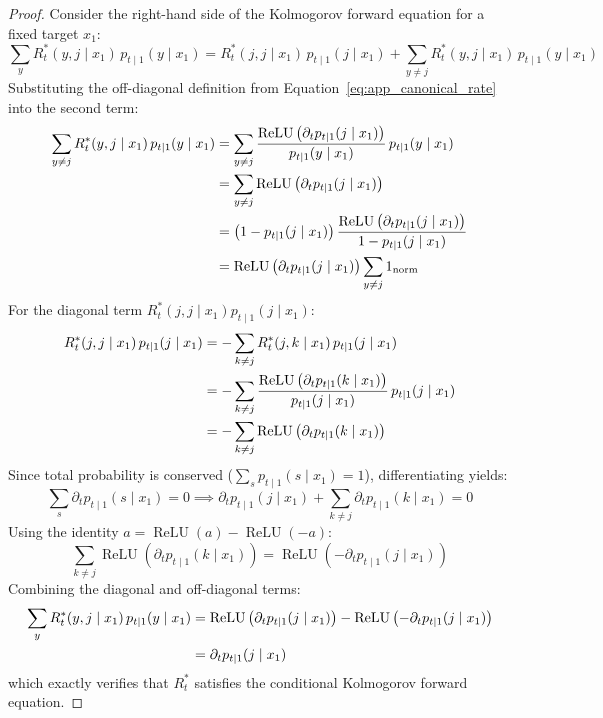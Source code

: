 \begin{proof}
Consider the right-hand side of the Kolmogorov forward equation for a fixed target $x_1$:
\begin{equation}
\sum_{y} R_t^*(y, j \mid x_1) \, p_{t \mid 1}(y \mid x_1) = R_t^*(j, j \mid x_1) \, p_{t \mid 1}(j \mid x_1) + \sum_{y \ne j} R_t^*(y, j \mid x_1) \, p_{t \mid 1}(y \mid x_1)
\label{eq:app_kolm_split}
\end{equation}
Substituting the off-diagonal definition from Equation~\ref{eq:app_canonical_rate} into the second term:
\begin{align}
\sum_{y \ne j} R_t^*(y, j \mid x_1) \, p_{t \mid 1}(y \mid x_1) &= \sum_{y \ne j} \frac{\operatorname{ReLU}\left( \partial_t p_{t \mid 1}(j \mid x_1) \right)}{p_{t \mid 1}(y \mid x_1)} \, p_{t \mid 1}(y \mid x_1) \notag \\
&= \sum_{y \ne j} \operatorname{ReLU}\left( \partial_t p_{t \mid 1}(j \mid x_1) \right) \notag \\
&= \left( 1 - p_{t \mid 1}(j \mid x_1) \right) \frac{\operatorname{ReLU}\left( \partial_t p_{t \mid 1}(j \mid x_1) \right)}{1 - p_{t \mid 1}(j \mid x_1)} \notag \\
&= \operatorname{ReLU}\left( \partial_t p_{t \mid 1}(j \mid x_1) \right) \sum_{y \ne j} 1_{\text{norm}}
\end{align}
For the diagonal term $R_t^*(j, j \mid x_1) p_{t \mid 1}(j \mid x_1)$:
\begin{align}
R_t^*(j, j \mid x_1) \, p_{t \mid 1}(j \mid x_1) &= - \sum_{k \ne j} R_t^*(j, k \mid x_1) \, p_{t \mid 1}(j \mid x_1) \notag \\
&= - \sum_{k \ne j} \frac{\operatorname{ReLU}\left( \partial_t p_{t \mid 1}(k \mid x_1) \right)}{p_{t \mid 1}(j \mid x_1)} \, p_{t \mid 1}(j \mid x_1) \notag \\
&= - \sum_{k \ne j} \operatorname{ReLU}\left( \partial_t p_{t \mid 1}(k \mid x_1) \right)
\end{align}
Since total probability is conserved ($\sum_{s} p_{t \mid 1}(s \mid x_1) = 1$), differentiating yields:
\begin{equation}
\sum_{s} \partial_t p_{t \mid 1}(s \mid x_1) = 0 \implies \partial_t p_{t \mid 1}(j \mid x_1) + \sum_{k \ne j} \partial_t p_{t \mid 1}(k \mid x_1) = 0
\end{equation}
Using the identity $a = \operatorname{ReLU}(a) - \operatorname{ReLU}(-a)$:
\begin{equation}
\sum_{k \ne j} \operatorname{ReLU}\left( \partial_t p_{t \mid 1}(k \mid x_1) \right) = \operatorname{ReLU}\left( -\partial_t p_{t \mid 1}(j \mid x_1) \right)
\end{equation}
Combining the diagonal and off-diagonal terms:
\begin{align}
\sum_{y} R_t^*(y, j \mid x_1) \, p_{t \mid 1}(y \mid x_1) &= \operatorname{ReLU}\left( \partial_t p_{t \mid 1}(j \mid x_1) \right) - \operatorname{ReLU}\left( -\partial_t p_{t \mid 1}(j \mid x_1) \right) \notag \\
&= \partial_t p_{t \mid 1}(j \mid x_1)
\end{align}
which exactly verifies that $R_t^*$ satisfies the conditional Kolmogorov forward equation.
\end{proof}

